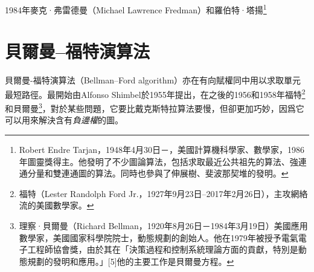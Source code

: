 1984年麥克·弗雷德曼（Michael Lawrence Fredman）和羅伯特·塔揚\footnote{Robert Endre Tarjan，1948年4月30日－，美國計算機科學家、數學家，1986年圖靈獎得主。他發明了不少圖論算法，包括求取最近公共祖先的算法、強連通分量和雙連通圖的算法。同時也參與了伸展樹、斐波那契堆的發明。}

\section{貝爾曼–福特演算法}

貝爾曼-福特演算法（Bellman–Ford algorithm）亦在有向賦權同中用以求取單元最短路徑。最開始由Alfonso Shimbel於1955年提出，在之後的1956和1958年福特\footnote{福特（Lester Randolph Ford Jr.，1927年9月23日–2017年2月26日），主攻網絡流的美國數學家。}和貝爾曼\footnote{理察·貝爾曼（Richard Bellman，1920年8月26日－1984年3月19日）美國應用數學家，美國國家科學院院士，動態規劃的創始人。他在1979年被授予電氣電子工程師協會獎，由於其在「決策過程和控制系統理論方面的貢獻，特別是動態規劃的發明和應用。」[5]他的主要工作是貝爾曼方程。}，對於某些問題，它要比戴克斯特拉算法要慢，但卻更加巧妙，因爲它可以用來解決含有\emph{負邊權}的圖。